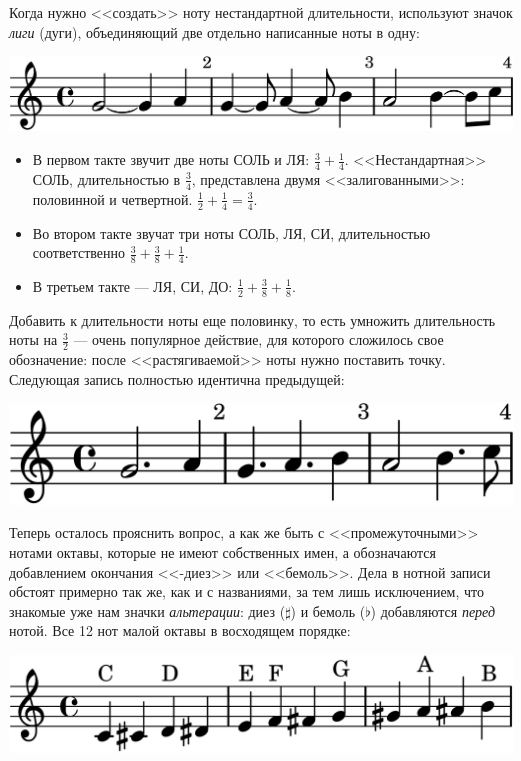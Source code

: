 Когда нужно <<создать>> ноту нестандартной длительности, используют значок \emph{лиги} (дуги), объединяющий две отдельно написанные ноты в одну:
\begin{center}    
    \includegraphics{fig/notes/tie}
\end{center}

\begin{itemize}
    \item В первом такте звучит две ноты СОЛЬ и ЛЯ: $\frac{3}{4} + \frac{1}{4}$. <<Нестандартная>> СОЛЬ, длительностью в $\frac{3}{4}$, представлена двумя <<залигованными>>: половинной и четвертной. $\frac{1}{2}+\frac{1}{4} = \frac{3}{4}$.
    
    \item Во втором такте звучат три ноты СОЛЬ, ЛЯ, СИ, длительностью соответственно $\frac{3}{8} + \frac{3}{8} + \frac{1}{4}$.
    
    \item В третьем такте --- ЛЯ, СИ, ДО: $\frac{1}{2} + \frac{3}{8} + \frac{1}{8}$. 
\end{itemize}

Добавить к длительности ноты еще половинку, то есть умножить длительность ноты на $\frac{3}{2}$ --- очень популярное действие, для которого сложилось свое обозначение: после <<растягиваемой>> ноты нужно поставить точку. Следующая запись полностью идентична предыдущей:
\begin{center}    
    \includegraphics{fig/notes/point}
\end{center}

Теперь осталось прояснить вопрос, а как же быть с <<промежуточными>> нотами октавы, которые не имеют собственных имен, а обозначаются добавлением окончания <<-диез>> или <<бемоль>>. Дела в нотной записи обстоят примерно так же, как и с названиями, за тем лишь исключением, что знакомые уже нам значки \emph{альтерации}: диез ($\sharp$) и бемоль ($\flat$) добавляются \emph{перед} нотой. Все 12 нот малой октавы в восходящем порядке:
\begin{center}    
    \includegraphics{fig/notes/octave-all-up}
\end{center}

